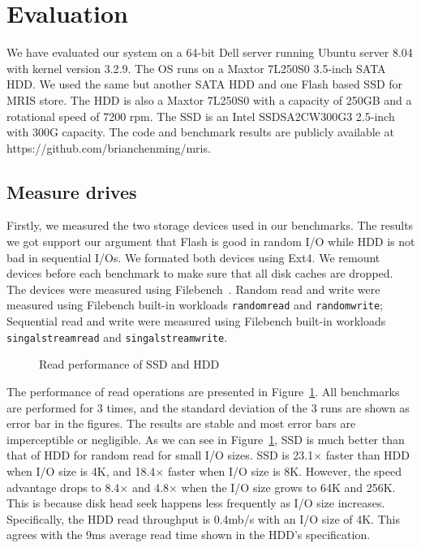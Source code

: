 \section{Evaluation} \label{sec:eval}

We have evaluated our system on a 64-bit Dell server running Ubuntu
server 8.04 with kernel version 3.2.9. The OS runs on a Maxtor 7L250S0
3.5-inch SATA HDD. We used the same but another SATA HDD and one Flash
based SSD for MRIS store. The HDD is also a Maxtor 7L250S0 with a
capacity of 250GB and a rotational speed of 7200 rpm.  The SSD is an
Intel SSDSA2CW300G3 2.5-inch with 300G capacity.  The code and
benchmark results are publicly available at
https://github.com/brianchenming/mris.

\subsection{Measure drives}

Firstly, we measured the two storage devices used in our benchmarks.
The results we got support our argument that Flash is good in random
I/O while HDD is not bad in sequential I/Os. We formated both devices
using Ext4. We remount devices before each benchmark to make sure that
all disk caches are dropped. The devices were measured using
Filebench~\cite{filebench-web}. Random read and write were measured
using Filebench built-in workloads \texttt{randomread} and
\texttt{randomwrite}; Sequential read and write were measured using
Filebench built-in workloads \texttt{singalstreamread} and
\texttt{singalstreamwrite}.

\begin{figure}[t]
\begin{centering}
\caption{Read performance of SSD and HDD}
\label{fig:driveread}
\end{centering}
\end{figure}

The performance of read operations are presented in
Figure~\ref{fig:driveread}. All benchmarks are performed for 3 times,
and the standard deviation of the 3 runs are shown as error bar in the
figures. The results are stable and most error bars are imperceptible
or negligible. As we can see in Figure~\ref{fig:driveread}, SSD is
much better than that of HDD for random read for small I/O sizes. SSD
is 23.1$\times$ faster than HDD when I/O size is 4K, and 18.4$\times$
faster when I/O size is 8K. However, the speed advantage drops to
8.4$\times$ and 4.8$\times$ when the I/O size grows to 64K and 256K.
This is because disk head seek happens less frequently as I/O size
increases. Specifically, the HDD read throughput is 0.4mb/s with an
I/O size of 4K. This agrees with the 9ms average read time shown in
the HDD's specification.  

